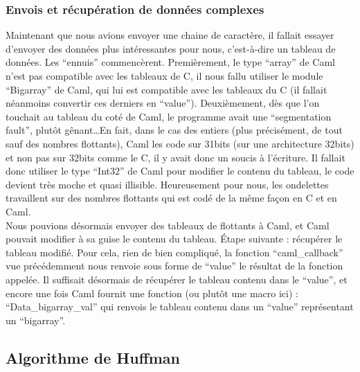 \documentclass[a4paper,12pt]{article}
\begin{document}
		\subsubsection{Envois et récupération de données complexes}
Maintenant que nous avions envoyer  une chaine de caractère,  il fallait
essayer d'envoyer des données plus intéressantes pour nous, c'est-à-dire
un tableau de  données.  Les ``ennuis'' commencèrent.  Premièrement,  le
type ``array'' de Caml n'est pas  compatible avec les tableaux de C,  il
nous  fallu  utiliser  le  module  ``Bigarray''  de  Caml,  qui  lui est
compatible avec  les tableaux du  C (il fallait  néanmoins convertir ces
derniers en ``value'').  Deuxièmement,  dès que l'on touchait au tableau
du coté de Caml,  le programme avait une ``segmentation fault'',  plutôt
gênant\ldots En fait, dans le cas des entiers (plus précisément, de tout
sauf  des  nombres  flottants),  Caml  les  code  sur  31bits  (sur  une
architecture 32bits) et non pas sur  32bits comme le C,  il y avait donc
un soucis à  l'écriture.  Il fallait donc utiliser le  type ``Int32'' de
Caml pour modifier le contenu du tableau,  le code devient très moche et
quasi illisible.  Heureusement pour nous, les ondelettes travaillent sur
des nombres flottants qui est codé de la même façon en C et en Caml.\\
Nous pouvions  désormais envoyer des  tableaux de flottants  à Caml,  et
Caml pouvait modifier à sa  guise le contenu du tableau.  Étape suivante
: récupérer le tableau modifié.  Pour cela,  rien de bien compliqué,  la
fonction ``caml\_callback'' vue précédemment  nous renvoie sous forme de
``value'' le résultat de la fonction appelée.  Il suffisait désormais de
récupérer le tableau contenu dans le ``value'',  et encore une fois Caml
fournit une fonction (ou plutôt une macro ici) : ``Data\_bigarray\_val''
qui  renvois  le  tableau  contenu  dans  un  ``value''  représentant un
``bigarray''.

	\subsection{Algorithme de Huffman}
\end{document}
